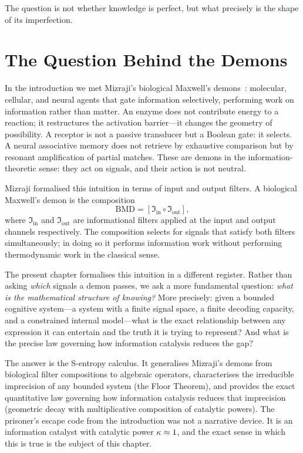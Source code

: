 \epigraph{The question is not whether knowledge is perfect, but what precisely is the shape of its imperfection.}{}


\section{The Question Behind the Demons}
\label{sec:question-behind-demons}

In the introduction we met Mizraji's biological Maxwell's demons~\citep{mizraji2021}: molecular, cellular, and neural agents that gate information selectively, performing work on information rather than matter. An enzyme does not contribute energy to a reaction; it restructures the activation barrier---it changes the geometry of possibility. A receptor is not a passive transducer but a Boolean gate: it selects. A neural associative memory does not retrieve by exhaustive comparison but by resonant amplification of partial matches. These are demons in the information-theoretic sense: they act on signals, and their action is not neutral.

Mizraji formalised this intuition in terms of input and output filters. A biological Maxwell's demon is the composition
\[
\mathrm{BMD} = [\mathfrak{I}_{\mathrm{in}} \circ \mathfrak{I}_{\mathrm{out}}],
\]
where $\mathfrak{I}_{\mathrm{in}}$ and $\mathfrak{I}_{\mathrm{out}}$ are informational filters applied at the input and output channels respectively. The composition selects for signals that satisfy both filters simultaneously; in doing so it performs information work without performing thermodynamic work in the classical sense.

The present chapter formalises this intuition in a different register. Rather than asking \textit{which} signals a demon passes, we ask a more fundamental question: \textit{what is the mathematical structure of knowing?} More precisely: given a bounded cognitive system---a system with a finite signal space, a finite decoding capacity, and a constrained internal model---what is the exact relationship between any expression it can entertain and the truth it is trying to represent? And what is the precise law governing how information catalysis reduces the gap?

The answer is the S-entropy calculus. It generalises Mizraji's demons from biological filter compositions to algebraic operators, characterises the irreducible imprecision of any bounded system (the Floor Theorem), and provides the exact quantitative law governing how information catalysis reduces that imprecision (geometric decay with multiplicative composition of catalytic powers). The prisoner's escape code from the introduction was not a narrative device. It is an information catalyst with catalytic power $\kappa \approx 1$, and the exact sense in which this is true is the subject of this chapter.


